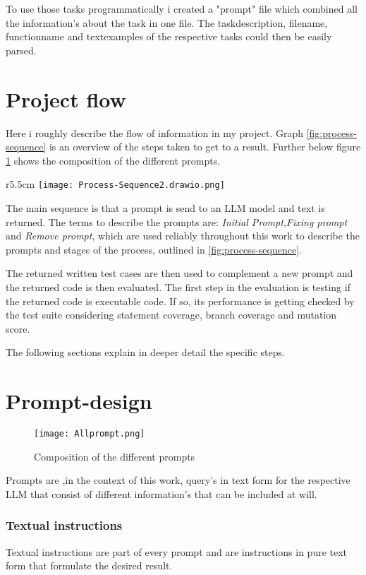 \documentclass[a4paper,11pt,oneside]{memoir}
\begin{document}
To use those tasks programmatically i created a "prompt" file which combined all the information's about the task in one file. The taskdescription, filename, functionname and textexamples of the respective tasks could then be easily parsed. 

\section{Project flow}

Here i roughly describe the flow of information in my project. 
Graph \ref{fig:process-sequence} is an overview of the steps taken to get to a result. Further below figure \ref{fig:all_prompts} shows the composition of the different prompts. 
\begin{wrapfigure}[22]{r}{5.5cm}
    \texttt{[image: Process-Sequence2.drawio.png]}
    \caption{Process Sequence}
    \label{fig:process-sequence}
\end{wrapfigure}

The main sequence is that a prompt is send to an LLM model and text is returned. 
The terms to describe the prompts are: \textit{Initial Prompt},\textit{Fixing prompt} and \textit{Remove prompt}, which are used reliably throughout this work to describe the prompts and stages of the process, outlined in \ref{fig:process-sequence}.

The returned written test cases are then used to complement a new prompt and the returned code is then evaluated. The first step in the evaluation is testing if the returned code is executable code. If so, its performance is getting checked by the test suite considering statement coverage, branch coverage and mutation score.  

The following sections explain in deeper detail the specific steps.

\section{Prompt-design}
\begin{figure}
    \centering
    \texttt{[image: Allprompt.png]}
    \caption{Composition of the different prompts}
    \label{fig:all_prompts}
\end{figure}

Prompts are ,in the context of this work, query's in text form for the respective LLM that consist of different information's that can be included at will.

\subsubsection{Textual instructions}
Textual instructions are part of every prompt and are instructions in pure text form that formulate the desired result.
\end{document}
